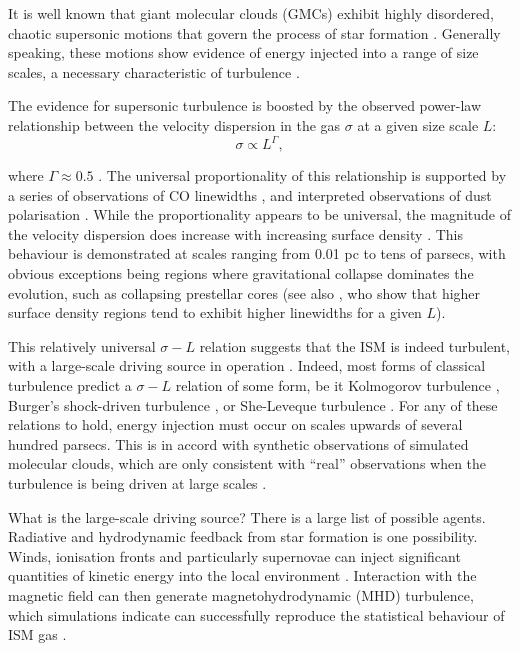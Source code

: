 \documentclass[a4paper,fleqn,usenatbib]{mnras}
\newcommand{\red}[1]{\textcolor{red}{#1}}
\begin{document}
It is well known that giant molecular clouds (GMCs) exhibit highly disordered, chaotic supersonic motions that govern the process of star formation \citep[see e.g.][ for a review]{McKee2007}.  Generally speaking, these motions show evidence of energy injected into a range of size scales, a necessary characteristic of turbulence \citep{Elmegreen2004}.

The evidence for supersonic turbulence is boosted by the observed power-law relationship between the velocity dispersion in the gas $\sigma$ at a given size scale $L$:
\begin{equation}
\sigma \propto L^{\Gamma},
\end{equation}


\noindent where $\Gamma \approx 0.5$ \citep{Larson1981}.  The universal proportionality of this relationship is supported by a series of observations of CO linewidths \citep{Heyer2004, Rice2016,Sun2017}, and interpreted observations of dust polarisation \citep[e.g.][]{Poidevin2013}.  While the proportionality appears to be universal, the magnitude of the velocity dispersion does increase with increasing surface density \citep{Heyer2009}.    This behaviour is demonstrated at scales ranging from 0.01 pc to tens of parsecs, with obvious exceptions being regions where gravitational collapse dominates the evolution, such as collapsing prestellar cores (see also \citealt{Leroy2016}, who show that higher surface density regions tend to exhibit higher linewidths for a given $L$).

This relatively universal $\sigma-L$ relation suggests that the ISM is indeed turbulent, with a large-scale driving source in operation \citep{Kritsuk2013}. Indeed, most forms of classical turbulence predict a $\sigma-L$ relation of some form, be it Kolmogorov turbulence \citep[$\Gamma=0.33$,][]{Passot1988}, Burger's shock-driven turbulence \citep[$\Gamma=0.5$,][]{Scalo1998}, or She-Leveque turbulence \citep[$\Gamma=0.42$,][]{She1994, Boldyrev2002}.  For any of these relations to hold, energy injection must occur on scales upwards of several hundred parsecs. This is in accord with synthetic observations of simulated molecular clouds, which are only consistent with ``real'' observations when the turbulence is being driven at large scales \citep{Brunt2009}.

What is the large-scale driving source? There is a large list of possible agents.  Radiative and hydrodynamic feedback from star formation is one possibility.  Winds, ionisation fronts and particularly supernovae can inject significant quantities of kinetic energy into the local environment \citep{Gressel2008}.  Interaction with the magnetic field can then generate magnetohydrodynamic (MHD) turbulence, which simulations indicate can successfully reproduce the statistical behaviour of ISM gas \citep{Kritsuk2007,Federrath2010,Padoan2011}.
\end{document}
